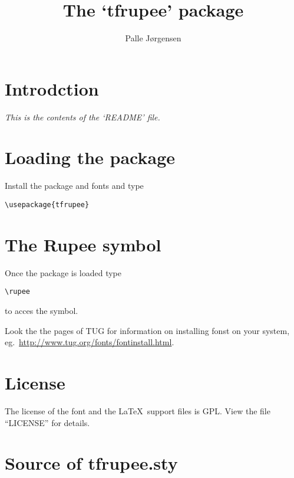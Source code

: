 \documentclass[paper=a4,11pt,british,DIV=calc,parskip=half-]{scrartcl}
\title{The `tfrupee' package}
\author{Palle Jørgensen}
\begin{document}
\maketitle

\section{Introdction}
\label{sec:introdction}

\emph{This is the contents of the `README' file.}



\section{Loading the package}
\label{sec:loading-package}

Install the package and fonts and type

\begin{lstlisting}
\usepackage{tfrupee}
\end{lstlisting}

\section{The Rupee symbol}
\label{sec:rupee-symbol}

Once the package is loaded type
\begin{lstlisting}
\rupee
\end{lstlisting}
to acces the symbol.

Look the the pages of TUG for information on installing fonst on your
system, eg.\ \url{http://www.tug.org/fonts/fontinstall.html}.

\section{License}
\label{sec:license}

The license of the font and the \LaTeX\ support files is GPL. View the
file \mbox{``LICENSE''} for details.

\section{Source of tfrupee.sty}
\label{sec:source-tfrupee.sty}


\end{document}
